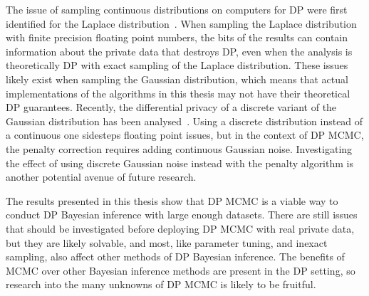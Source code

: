 \documentclass[english,twoside,openright]{HYgraduMLDS}
\begin{document}
The issue of sampling continuous distributions on computers for DP were first
identified for the Laplace distribution~\cite{Mir12}. When sampling the Laplace
distribution with finite precision floating point numbers, the bits of the
results can contain information about the private data that destroys DP, even
when the analysis is theoretically DP with exact sampling of the Laplace
distribution. These issues likely exist when sampling the Gaussian distribution,
which means that actual implementations of the algorithms in this thesis may
not have their theoretical DP guarantees. Recently, the differential privacy
of a discrete variant of the Gaussian distribution has been
analysed~\cite{C0S20}. Using a discrete distribution instead of a continuous one
sidesteps floating point issues, but in the context of DP MCMC, the penalty
correction requires adding continuous Gaussian noise. Investigating the effect
of using discrete Gaussian noise instead with the penalty algorithm is another
potential avenue of future research.

The results presented in this thesis show that DP MCMC is a viable way to
conduct DP Bayesian inference with large enough datasets. There are still
issues that should be investigated before deploying DP MCMC with real
private data, but they are likely solvable, and most, like parameter tuning,
and inexact sampling, also affect other methods of DP Bayesian inference.
The benefits of MCMC over other Bayesian inference methods are present in the
DP setting, so research into the many unknowns of DP MCMC is likely to be
fruitful.


\cleardoublepage %


\end{document}
